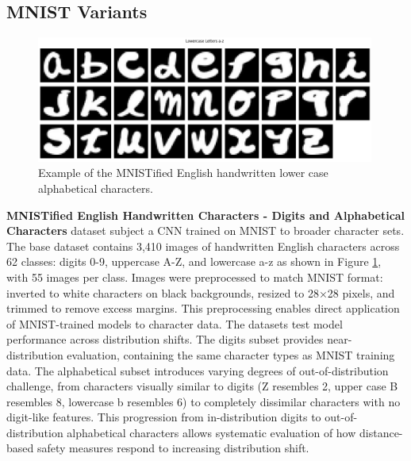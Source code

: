 


\subsection{MNIST Variants}
\begin{figure}[h]
\centering
\includegraphics[width=0.99\textwidth]{Figures/Results/HandwrittenCharacters/mnistified-a-z.png}
\caption{Example of the MNISTified English handwritten lower case alphabetical characters.}
\label{fig:mnistified-a-z-methods}
\end{figure}

\textbf{MNISTified English Handwritten Characters - Digits and Alphabetical Characters} dataset \cite{deCampos09} subject a CNN trained on MNIST to broader character sets. The base dataset contains 3,410 images of handwritten English characters across 62 classes: digits 0-9, uppercase A-Z, and lowercase a-z as shown in Figure \ref{fig:mnistified-a-z-methods}, with 55 images per class.
Images were preprocessed to match MNIST format: inverted to white characters on black backgrounds, resized to 28×28 pixels, and trimmed to remove excess margins. This preprocessing enables direct application of MNIST-trained models to character data.
The datasets test model performance across distribution shifts. The digits subset provides near-distribution evaluation, containing the same character types as MNIST training data. The alphabetical subset introduces varying degrees of out-of-distribution challenge, from characters visually similar to digits (Z resembles 2, upper case B resembles 8, lowercase b resembles 6) to completely dissimilar characters with no digit-like features.
This progression from in-distribution digits to out-of-distribution alphabetical characters allows systematic evaluation of how distance-based safety measures respond to increasing distribution shift.

